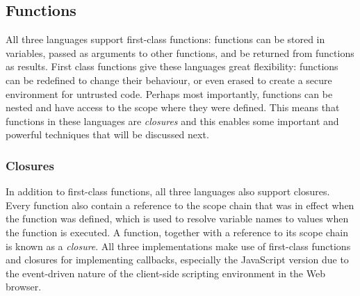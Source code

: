 \subsection{Functions}
\label{functions}

All three languages support first-class functions: functions can be stored
in variables, passed as arguments to other functions, and be returned
from functions as results. First class functions give these languages
great flexibility: functions can be redefined to change their behaviour,
or even erased to create a secure environment for untrusted code. Perhaps
most importantly, functions can be nested and have access to the scope where
they were defined. This means that functions in these languages are \emph{closures}
and this enables some important and powerful techniques that will be discussed next.

\subsubsection{Closures}
\label{closures}


In addition to first-class functions, all three languages also support closures.
Every function also contain a reference to the scope chain that was
in effect when the function was defined, which is used to resolve variable
names to values when the function is executed. A function, together with a
reference to its scope chain is known as a \emph{closure}.
All three implementations make use of first-class functions and closures for 
implementing callbacks, especially the JavaScript version due to the 
event-driven nature of the client-side scripting environment in the Web browser.


